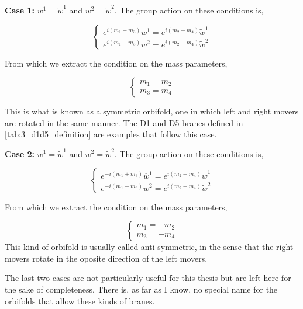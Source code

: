 \textbf{Case 1: } $w^1 = \tilde{w}^1$ and $w^2 = \tilde{w}^2$. The group action on these conditions is,

\begin{equation}
    \begin{cases}
        e^{i(m_1 + m_3)} w^1 = e^{i(m_2 + m_4)} \tilde{w}^1 \\
        e^{i(m_1 - m_3)} w^2 = e^{i(m_2 - m_4)} \tilde{w}^2
    \end{cases}
\end{equation}

From which we extract the condition on the mass parameters,

\begin{equation}
    \begin{cases}
        m_1 = m_2 \\
        m_3 = m_4
    \end{cases}
\end{equation}

This is what is known as a symmetric orbifold, one in which left and right movers are rotated in the same manner. The D1 and D5 branes defined in \ref{tab:3_d1d5_definition} are examples that follow this case.

\textbf{Case 2: } $\overline{w}^1 = \tilde{w}^1$ and $\overline{w}^2 = \tilde{w}^2$. The group action on these conditions is,

\begin{equation}
    \begin{cases}
        e^{-i(m_1 + m_3)} \overline{w}^1 = e^{i(m_2 + m_4)} \tilde{w}^1 \\
        e^{-i(m_1 - m_3)} \overline{w}^2 = e^{i(m_2 - m_4)} \tilde{w}^2
    \end{cases}
\end{equation}

From which we extract the condition on the mass parameters,

\begin{equation}
    \begin{cases}
        m_1 = -m_2 \\
        m_3 = -m_4
    \end{cases}
\end{equation}
This kind of orbifold is usually called anti-symmetric, in the sense that the right movers rotate in the oposite direction of the left movers.

The last two cases are not particularly useful for this thesis but are left here for the sake of completeness. There is, as far as I know, no special name for the orbifolds that allow these kinds of branes.

